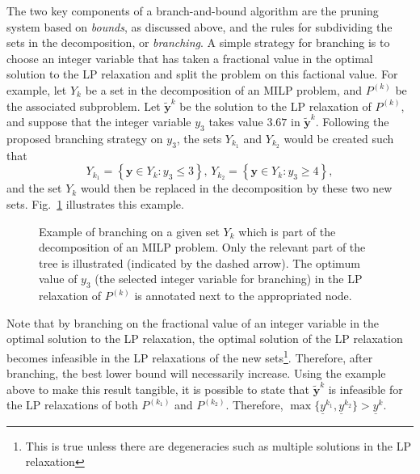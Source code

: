 The two key components of a branch-and-bound algorithm are the pruning system based on \emph{bounds}, as discussed above, and the rules for subdividing the sets in the decomposition, or \emph{branching}.
A simple strategy for branching is to choose an integer variable that has taken a fractional value in the optimal solution to the LP relaxation and split the problem on this factional value.
For example, let $Y_k$ be a set in the decomposition of an MILP problem, and $P^{(k)}$ be the associated subproblem.
Let $\widetilde{\bm{y}}^{k}$ be the solution to the LP relaxation of $P^{(k)}$, and suppose that the integer variable $y_3$ takes value $3.67$ in $\widetilde{\bm{y}}^{k}$.
Following the proposed branching strategy on $y_3$, the sets $Y_{k_1}$ and $Y_{k_2}$ would be created such that \[
Y_{k_1} = \left\{ \bm{y} \in Y_k : y_3 \le 3 \right\} ,\, Y_{k_2} = \left\{ \bm{y}\in Y_k : y_3 \ge 4 \right\} 
,\] and the set $Y_k$ would then be replaced in the decomposition by these two new sets.
Fig.~\ref{fig:branching-example} illustrates this example.

\begin{figure}[h]
    \centering
    \caption{Example of branching on a given set $Y_k$ which is part of the decomposition of an MILP problem. Only the relevant part of the tree is illustrated (indicated by the dashed arrow). The optimum value of $y_3$ (the selected integer variable for branching) in the LP relaxation of $P^{(k)}$ is annotated next to the appropriated node.}
    \label{fig:branching-example}
\end{figure}

Note that by branching on the fractional value of an integer variable in the optimal solution to the LP relaxation, the optimal solution of the LP relaxation becomes infeasible in the LP relaxations of the new sets\footnote{This is true unless there are degeneracies such as multiple solutions in the LP relaxation}.
Therefore, after branching, the best lower bound will necessarily increase.
Using the example above to make this result tangible, it is possible to state that $\widetilde{\bm{y}}^{k}$ is infeasible for the LP relaxations of both $P^{(k_1)}$ and $P^{(k_2)}$.
Therefore, $\max\{\underline{y}^{k_1},\underline{y}^{k_2}\} > \underline{y}^{k}$.

